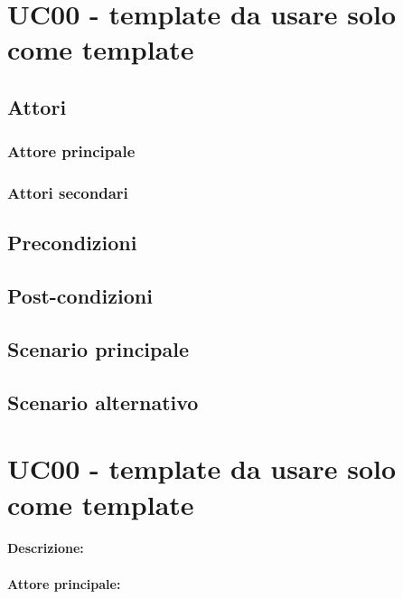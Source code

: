 \section{UC00 - template da usare solo come template}


\subsection{Attori}
\subsubsection{Attore principale}
\subsubsection{Attori secondari} %
\subsection{Precondizioni}
\subsection{Post-condizioni}
\subsection{Scenario principale}
\subsection{Scenario alternativo}

\section{UC00 - template da usare solo come template}

\paragraph{Descrizione:}

\paragraph{Attore principale:}


